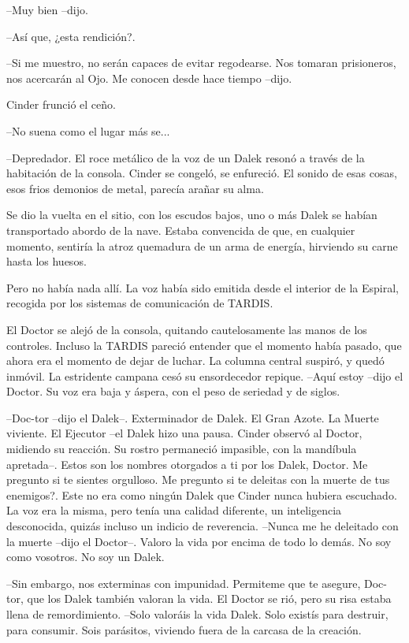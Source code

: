 --Muy bien --dijo.

--Así que, ¿esta rendición?.

--Si me muestro, no serán capaces de evitar regodearse. Nos tomaran prisioneros, nos acercarán al Ojo. Me conocen desde hace tiempo --dijo.

Cinder frunció el ceño. 

--No suena como el lugar más se...

--Depredador.
El roce metálico de la voz de un Dalek resonó a través de la habitación de la consola. Cinder se congeló, se enfureció. El sonido de esas cosas, esos frios demonios de metal, parecía arañar su alma.

Se dio la vuelta en el sitio, con los escudos bajos, uno o más Dalek se habían transportado abordo de la nave. Estaba convencida de que, en cualquier momento, sentiría la atroz quemadura de un arma de energía, hirviendo su carne hasta los huesos.

Pero no había nada allí. La voz había sido emitida desde el interior de la Espiral, recogida por los sistemas de comunicación de TARDIS.

El Doctor se alejó de la consola, quitando cautelosamente las manos de los controles. Incluso la TARDIS pareció entender que el momento había pasado, que ahora era el momento de dejar de luchar. La columna central suspiró, y quedó inmóvil. La estridente campana cesó su ensordecedor repique.
--Aquí estoy --dijo el Doctor. Su voz era baja y áspera, con el peso de seriedad y de siglos.

--Doc-tor --dijo el Dalek--. Exterminador de Dalek. El Gran Azote. La Muerte viviente. El Ejecutor --el Dalek hizo una pausa. Cinder observó al Doctor, midiendo su reacción. Su rostro permaneció impasible, con la mandíbula apretada--. Estos son los nombres otorgados a ti por los Dalek, Doctor. Me pregunto si te sientes orgulloso. Me pregunto si te deleitas con la muerte de tus enemigos?.
Este no era como ningún Dalek que Cinder nunca hubiera escuchado. La voz era la misma, pero tenía una calidad diferente, un inteligencia desconocida, quizás incluso un indicio de reverencia.
--Nunca me he deleitado con la muerte --dijo el Doctor--. Valoro la vida por encima de todo lo demás. No soy como vosotros. No soy un Dalek.

--Sin embargo, nos exterminas con impunidad. Permiteme que te asegure, Doc-tor, que los Dalek también valoran la vida.
El Doctor se rió, pero su risa estaba llena de remordimiento. 
--Solo valoráis la vida Dalek. Solo existís para destruir, para consumir. Sois parásitos, viviendo fuera de la carcasa de la creación.

